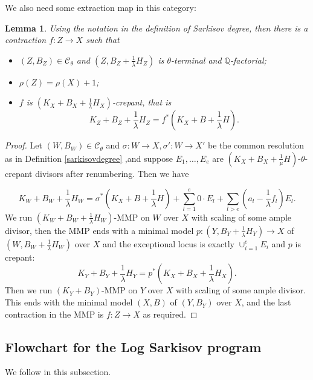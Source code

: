 \documentclass{article}
\newtheorem{lem}[defn]{Lemma}
\begin{document}
We also need some  extraction map in this category: 
\begin{lem}\label{thetaextraction}
Using the notation in the definition of Sarkisov degree, then there is a contraction  $f:Z\to X$ such that 
\begin{itemize}
  \item $(Z,B_{Z})\in \mathcal{C}_{\theta}$ and $(Z,B_{Z}+\frac{1}{\lambda}H_{Z})$ is $\theta$-terminal and $\mathbb{Q}$-factorial;
    \item  $\rho(Z)=\rho(X)+1$;
    \item $f$ is $(K_{X}+B_{X}+\frac{1}{\lambda}H_{X})$-crepant, that is 
      \[
        K_{Z}+B_{Z}+\frac{1}{\lambda}H_{Z}=f^*(K_{X}+B+\frac{1}{\lambda}H)
      .\] 
\end{itemize}
\end{lem}
\begin{proof}
  Let $(W,B_{W})\in \mathcal{C}_{\theta}$ and $\sigma:W\to X,\sigma':W \to X'$ be the common resolution as in Definition \ref{sarkisovdegree} ,and suppose  $E_{1},\ldots ,E_{e}$ are   $(K_{X}+B_{X}+\frac{1}{\mu}H)$-$\theta$-crepant divisors after renumbering. Then we have

\[ K_W+B_W+\frac{1}{\lambda} H_W=\sigma^*(K_X+B+\frac{1}{\lambda} H)+\sum_{l=1}^{e} 0\cdot E_{l}+\sum_{l>e}(a_l-\frac{1}{\lambda} f_l)E_l .\]
We run $(K_{W}+B_{W}+\frac{1}{\lambda}H_{W})$-MMP on $W$ over $X$ with scaling of some ample divisor, then the MMP ends with a minimal model $p:(Y,B_{Y}+\frac{1}{\lambda}H_{Y})\to X$  of $(W,B_{W}+\frac{1}{\lambda}H_{W})$ over $X$ and the exceptional locus is exactly $\cup_{i=1}^{e}E_{i}$ and $p$ is crepant: 
\[
 K_{Y}+B_{Y}+\frac{1}{\lambda}H_{Y}=p^*(K_{X}+B_{X}+\frac{1}{\lambda}H_{X}) 
.\]
Then we run $(K_{Y}+B_{Y})$-MMP on $Y$ over $X$ with scaling of some ample divisor. This ends with the minimal model  $(X,B)$ of $(Y,B_{Y})$ over $X$, and the last contraction  in the MMP is $f:Z\to X$  as required.
\end{proof}
\subsection{Flowchart for the Log Sarkisov program}
We follow \cite[Flowchart for the Sarkisov program]{brunoLogSarkisovProgram1995} in this subsection.
\end{document}
